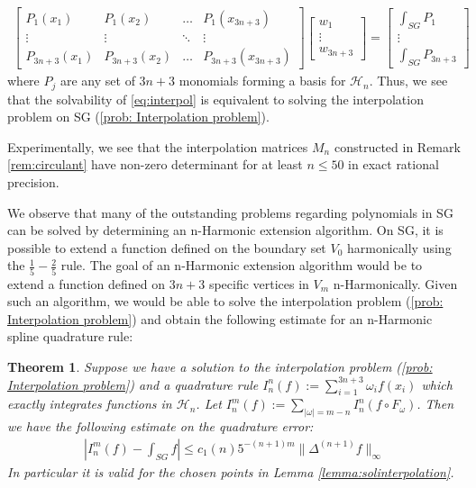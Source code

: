 \documentclass[12pt]{amsart}
\theoremstyle{plain}
\newtheorem{theorem}{Theorem}[section]
\theoremstyle{definition}
\begin{document}
\begin{align}\label{eq:interpol}
    \begin{bmatrix}
    P_{1}(x_1) & P_{1}(x_{2}) & \dots & P_{1}(x_{3n+3})\\
    \vdots & \vdots & \ddots & \vdots \\
    P_{3n+3}(x_{1}) & P_{3n+3}(x_{2}) & \dots & P_{3n+3}(x_{3n+3})
    \end{bmatrix}
    \begin{bmatrix}
    w_1\\
    \vdots\\
    w_{3n+3}
    \end{bmatrix} = 
    \begin{bmatrix}
    \int_{SG}P_{1}\\
    \vdots\\
    \int_{SG}P_{3n+3}
    \end{bmatrix}
\end{align}
where $P_j$ are any set of $3n+3$ monomials forming a basis for $\mathcal{H}_n$. Thus, we see that the solvability of \ref{eq:interpol} is equivalent to solving the interpolation problem on SG (\ref{prob: Interpolation problem}).

Experimentally, we see that the interpolation matrices $M_n$ constructed in Remark \ref{rem:circulant} have non-zero determinant for at least $n \leq 50$ in exact rational precision.

We observe that many of the outstanding problems regarding polynomials in SG can be solved by determining an n-Harmonic extension algorithm. On SG, it is possible to extend a function defined on the boundary set $V_0$ harmonically using the $\frac15-\frac25$ rule. The goal of an n-Harmonic extension algorithm would be to extend a function defined on $3n+3$ specific vertices in $V_m$ n-Harmonically. Given such an algorithm, we would be able to solve the interpolation problem (\ref{prob: Interpolation problem}) and obtain the following estimate for an n-Harmonic spline quadrature rule:

\begin{theorem}

\label{thm:nharmquad}
Suppose we have a solution to the interpolation problem (\ref{prob: Interpolation problem}) and a quadrature rule $I_n^n(f):=\sum\limits_{i=1}^{3n+3}\omega_if(x_i)$ which exactly integrates functions in $\mathcal{H}_n$. Let $I_n^m(f):=\sum\limits_{|\omega|=m-n}I^n_n(f\circ F_\omega)$. Then we have the following estimate on the quadrature error:
\begin{align}
    \left|I_n^m(f) - \int_{SG}f\right|\leq c_1(n)5^{-(n+1)m}\|\Delta^{(n+1)}f\|_\infty
\end{align}
In particular it is valid for the chosen points in Lemma \ref{lemma:solinterpolation}.
\end{theorem}
\end{document}

